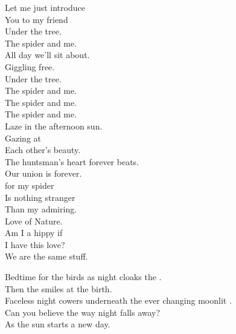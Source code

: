 




Let me just introduce \\
You to my friend \\
Under the tree. \\
The spider and me. \\
All day we'll sit about. \\
Giggling free. \\
Under the tree. \\
The spider and me. \\

The spider and me. \\
The spider and me. \\

Laze in the afternoon sun. \\
Gazing at \\
Each other's beauty. \\
The huntsman's heart forever beats. \\
Our union is forever. \\

 for my spider \\
Is nothing stranger \\
Than my admiring. \\
Love of Nature. \\
Am I a hippy if \\
I have this love? \\
We are the same stuff. \\








Bedtime for the birds as night cloaks the . \\
Then the  smiles at the  birth. \\
Faceless night cowers underneath the ever changing moonlit . \\
Can you believe the way night falls away? \\
As the sun starts a new day. \\

